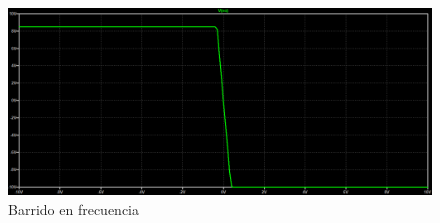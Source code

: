 \documentclass[11pt, a4paper]{article}
\begin{document}
\begin{figure}[h]
    \centering
    \includegraphics[scale=0.4]{Imagenes/barrido_-10V_10V_continua.png}
    \caption{Barrido en frecuencia}
    \label{fig:enter-label}
\end{figure}
\end{document}
